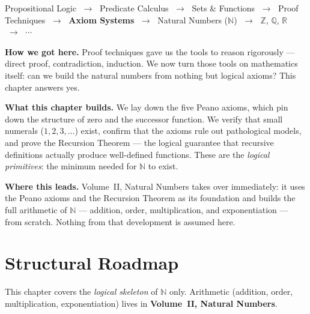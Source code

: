 \begin{tcolorbox}[
  colback=gray!6,
  colframe=gray!40,
  arc=2pt,
  left=8pt, right=8pt, top=6pt, bottom=6pt,
  title={\small\textbf{Where You Are in the Journey}},
  fonttitle=\small\bfseries
]
\begin{center}
\small
Propositional Logic
$\;\to\;$ Predicate Calculus
$\;\to\;$ Sets \& Functions
$\;\to\;$ Proof Techniques
$\;\to\;$ \textbf{Axiom Systems}
$\;\to\;$ Natural Numbers ($\mathbb{N}$)
$\;\to\;$ $\mathbb{Z}$, $\mathbb{Q}$, $\mathbb{R}$
$\;\to\;$ $\cdots$
\end{center}

\medskip
\noindent\textbf{How we got here.}
Proof techniques gave us the tools to reason rigorously --- direct proof,
contradiction, induction.
We now turn those tools on mathematics itself: can we build the natural
numbers from nothing but logical axioms?
This chapter answers yes.

\medskip
\noindent\textbf{What this chapter builds.}
We lay down the five Peano axioms, which pin down the structure
of zero and the successor function.
We verify that small numerals ($1, 2, 3, \ldots$) exist, confirm
that the axioms rule out pathological models, and prove the
Recursion Theorem --- the logical guarantee that recursive
definitions actually produce well-defined functions.
These are the \emph{logical primitives}: the minimum needed for
$\mathbb{N}$ to exist.

\medskip
\noindent\textbf{Where this leads.}
Volume~II, Natural Numbers takes over immediately: it uses the Peano
axioms and the Recursion Theorem as its foundation and builds the full
arithmetic of $\mathbb{N}$ --- addition, order, multiplication, and
exponentiation --- from scratch.
Nothing from that development is assumed here.
\end{tcolorbox}
\vspace{1em}

\section*{Structural Roadmap}

This chapter covers the \emph{logical skeleton} of $\mathbb{N}$ only.
Arithmetic (addition, order, multiplication, exponentiation) lives in
\textbf{Volume~II, Natural Numbers}.


